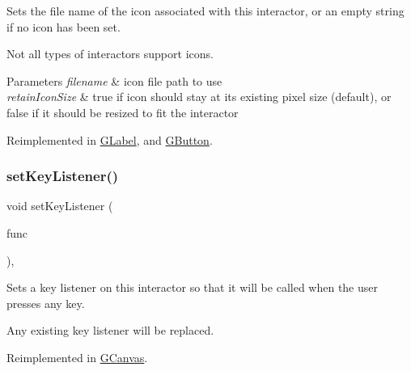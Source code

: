 Sets the file name of the icon associated with this interactor, or an empty string if no icon has been set. 

Not all types of interactors support icons. 
\begin{DoxyParams}{Parameters}
{\em filename} & icon file path to use \\
\hline
{\em retain\+Icon\+Size} & true if icon should stay at its existing pixel size (default), or false if it should be resized to fit the interactor \\
\hline
\end{DoxyParams}


Reimplemented in \mbox{\hyperlink{classsgl_1_1GLabel_abbefcb1f611af273755c7e1cca921497}{G\+Label}}, and \mbox{\hyperlink{classsgl_1_1GButton_abbefcb1f611af273755c7e1cca921497}{G\+Button}}.

\mbox{\label{classsgl_1_1GInteractor_aeb8324d3287fa1fbe093f4d6230cf0a6}} 
\subsubsection{\texorpdfstring{set\+Key\+Listener()}{setKeyListener()}\hspace{0.1cm}{\footnotesize\ttfamily [1/2]}}
{\footnotesize\ttfamily void set\+Key\+Listener (\begin{DoxyParamCaption}\item[{\mbox{\hyperlink{namespacesgl_ae9f3e9eab70035da1a2b114e21357b25}{G\+Event\+Listener}}}]{func }\end{DoxyParamCaption})\hspace{0.3cm}{\ttfamily [virtual]}, {\ttfamily [inherited]}}



Sets a key listener on this interactor so that it will be called when the user presses any key. 

Any existing key listener will be replaced. 

Reimplemented in \mbox{\hyperlink{classsgl_1_1GCanvas_a53809ec015da5bf9fad5e7a11b218993}{G\+Canvas}}.

\mbox{\label{classsgl_1_1GInteractor_ae48ecea73606c7bd9423e1c7cc589cc9}} 

